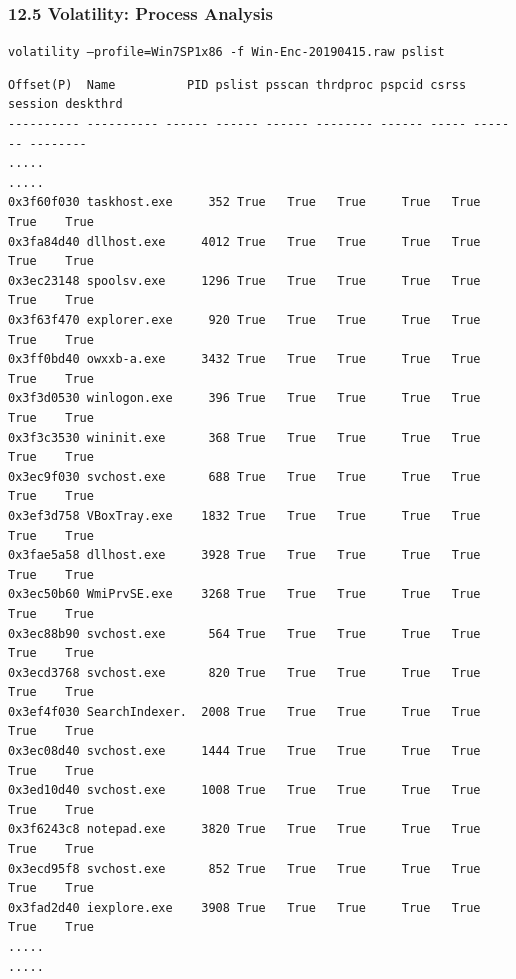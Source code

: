 \begin{frame}[fragile]
  \frametitle{12.5 Volatility: Process Analysis}
    \texttt{\footnotesize volatility --profile=Win7SP1x86 -f Win-Enc-20190415.raw pslist}
    \begin{lstlisting}[basicstyle=\tiny]
Offset(P)  Name          PID pslist psscan thrdproc pspcid csrss session deskthrd
---------- ---------- ------ ------ ------ -------- ------ ----- ------- --------
.....
.....
0x3f60f030 taskhost.exe     352 True   True   True     True   True  True    True
0x3fa84d40 dllhost.exe     4012 True   True   True     True   True  True    True
0x3ec23148 spoolsv.exe     1296 True   True   True     True   True  True    True
0x3f63f470 explorer.exe     920 True   True   True     True   True  True    True
0x3ff0bd40 owxxb-a.exe     3432 True   True   True     True   True  True    True
0x3f3d0530 winlogon.exe     396 True   True   True     True   True  True    True
0x3f3c3530 wininit.exe      368 True   True   True     True   True  True    True
0x3ec9f030 svchost.exe      688 True   True   True     True   True  True    True
0x3ef3d758 VBoxTray.exe    1832 True   True   True     True   True  True    True
0x3fae5a58 dllhost.exe     3928 True   True   True     True   True  True    True
0x3ec50b60 WmiPrvSE.exe    3268 True   True   True     True   True  True    True
0x3ec88b90 svchost.exe      564 True   True   True     True   True  True    True
0x3ecd3768 svchost.exe      820 True   True   True     True   True  True    True
0x3ef4f030 SearchIndexer.  2008 True   True   True     True   True  True    True
0x3ec08d40 svchost.exe     1444 True   True   True     True   True  True    True
0x3ed10d40 svchost.exe     1008 True   True   True     True   True  True    True
0x3f6243c8 notepad.exe     3820 True   True   True     True   True  True    True
0x3ecd95f8 svchost.exe      852 True   True   True     True   True  True    True
0x3fad2d40 iexplore.exe    3908 True   True   True     True   True  True    True
.....
.....
    \end{lstlisting}
\end{frame}


